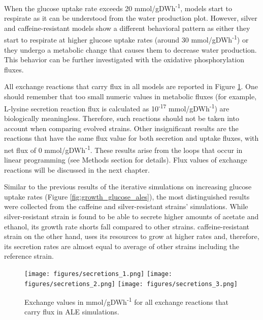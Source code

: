 \vspace{-1.0cm}

When the glucose uptake rate exceeds 20 mmol/gDWh\textsuperscript{-1}, models start to respirate as it can be understood from the water production plot. However, silver and caffeine-resistant models show a different behavioral pattern as either they start to respirate at higher glucose uptake rates (around 30 mmol/gDWh\textsuperscript{-1}) or they undergo a metabolic change that causes them to decrease water production. This behavior can be further  investigated with the oxidative phosphorylation fluxes.

All exchange reactions that carry flux in all models are reported in Figure \ref{fig:fba_exchanges_3}. One should remember that too small numeric values in metabolic fluxes (for example, L-lysine secretion reaction flux is calculated as 10\textsuperscript{-17} mmol/gDWh\textsuperscript{-1}) are biologically meaningless. Therefore, such reactions should not be taken into account when comparing evolved strains. Other insignificant results are the reactions that have the same flux value for both secretion and uptake fluxes, with net flux of 0 mmol/gDWh\textsuperscript{-1}. These results arise from the loops that occur in linear programming (see Methods section for details). Flux values of exchange reactions will be discussed in the next chapter.

Similar to the previous results of the iterative simulations on increasing glucose uptake rates (Figure \ref{fig:growth_glucose_ales}), the most distinguished results were collected from the caffeine and silver-resistant strains' simulations. While silver-resistant strain is found to be able to secrete higher amounts of acetate and ethanol, its growth rate shorts fall compared to other strains. caffeine-resistant strain on the other hand, uses its resources to grow at higher rates and, therefore, its secretion rates are almost equal to average of other strains including the reference strain.

\begin{figure}[H]
  \begin{center}
  \texttt{[image: figures/secretions\_1.png]}
  \texttt{[image: figures/secretions\_2.png]}
  \texttt{[image: figures/secretions\_3.png]}
  \caption[Exchange values in mmol/gDWh\textsuperscript{-1} for all exchange reactions that carry flux in ALE simulations]{Exchange values in mmol/gDWh\textsuperscript{-1} for all exchange reactions that carry flux in ALE simulations.}
  \label{fig:fba_exchanges_3}
  \end{center}
  \end{figure}
\vspace{-1.0cm}

